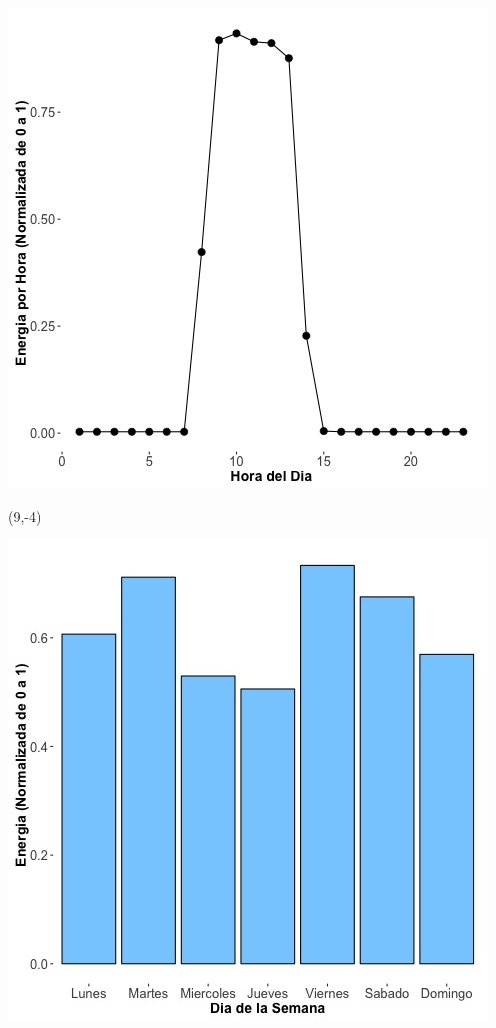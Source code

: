 \documentclass{article}\usepackage[]{graphicx}\usepackage[]{color}
\newenvironment{knitrout}{}{} %
\begin{document}
\begin{knitrout}
\color{fgcolor}
\includegraphics[scale=0.65]{figure/A28_plot_norm_median} 
\end{knitrout}


 \begin{textblock}{1}(9,-4)
\begin{minipage}{20em}
\begingroup

\endgroup
\end{minipage}
\end{textblock}


\begin{knitrout}
\color{fgcolor}
\includegraphics[scale=0.65]{figure/A28_day_of_week_plot} 
\end{knitrout}
\end{document}
